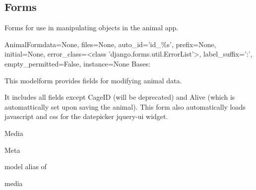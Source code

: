 \documentclass[letterpaper,10pt,english]{sphinxmanual}
\begin{document}
\subsection{Forms}
\hypertarget{module-animal.forms}{}
\modulesynopsis{}
Forms for use in manipulating objects in the animal app.

\hypertarget{animal.forms.AnimalForm}{}\begin{classdesc}{AnimalForm}{data=None, files=None, auto\_id='id\_\%s', prefix=None, initial=None, error\_class=\textless{}class 'django.forms.util.ErrorList'\textgreater{}, label\_suffix=':', empty\_permitted=False, instance=None}
Bases: 

This modelform provides fields for modifying animal data.

It includes all fields except CageID (will be deprecated) and Alive (which is automattically set upon saving the animal).
This form also automatically loads javascript and css for the datepicker jquery-ui widget.

\hypertarget{animal.forms.AnimalForm.Media}{}\begin{classdesc}{Media}{}\end{classdesc}

\hypertarget{animal.forms.AnimalForm.Meta}{}\begin{classdesc}{Meta}{}~

\hypertarget{animal.forms.AnimalForm.Meta.model}{}\begin{memberdesc}{model}
alias of 
\end{memberdesc}
\end{classdesc}

\hypertarget{animal.forms.AnimalForm.media}{}\begin{memberdesc}[AnimalForm]{media}\end{memberdesc}
\end{classdesc}
\end{document}
